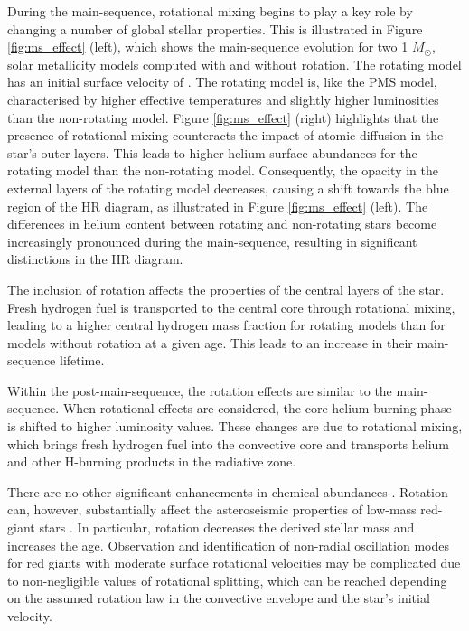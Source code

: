 During the main-sequence, rotational mixing begins to play a key role by changing a number of global stellar properties. 
This is illustrated in Figure \ref{fig:ms_effect} (left), which shows the main-sequence evolution for two 1 $M_{\odot}$, solar metallicity models computed with and without rotation.
The rotating model has an initial surface velocity of .
The rotating model is, like the PMS model, characterised by higher effective temperatures and slightly higher luminosities than the non-rotating model.
Figure \ref{fig:ms_effect} (right) highlights that the presence of rotational mixing counteracts the impact of atomic diffusion in the star's outer layers. 
This leads to higher helium surface abundances for the rotating model than the non-rotating model.
Consequently, the opacity in the external layers of the rotating model decreases, causing a shift towards the blue region of the HR diagram, as illustrated in Figure \ref{fig:ms_effect} (left). 
The differences in helium content between rotating and non-rotating stars become increasingly pronounced during the main-sequence, resulting in significant distinctions in the HR diagram.

The inclusion of rotation affects the properties of the central layers of the star. 
Fresh hydrogen fuel is transported to the central core through rotational mixing, leading to a higher central hydrogen mass fraction for rotating models than for models without rotation at a given age. 
This leads to an increase in their main-sequence lifetime.

Within the post-main-sequence, the rotation effects are similar to the main-sequence.
When rotational effects are considered, the core helium-burning phase is shifted to higher luminosity values. 
These changes are due to rotational mixing, which brings fresh hydrogen fuel into the convective core and transports helium and other H-burning products in the radiative zone.

There are no other significant enhancements in chemical abundances \citep[see Table 2 in][]{lagarde_thermohaline_2012}.
Rotation can, however, substantially affect the asteroseismic properties of low-mass red-giant stars \citep{lagarde_thermohaline_2012, eggenberger_effects_2010}.
In particular, rotation decreases the derived stellar mass and increases the age.
Observation and identification of non-radial oscillation modes for red giants with moderate surface rotational velocities may be complicated due to non-negligible values of rotational splitting, which can be reached depending on the assumed rotation law in the convective envelope and the star's initial velocity.\\
 \\
 \\


